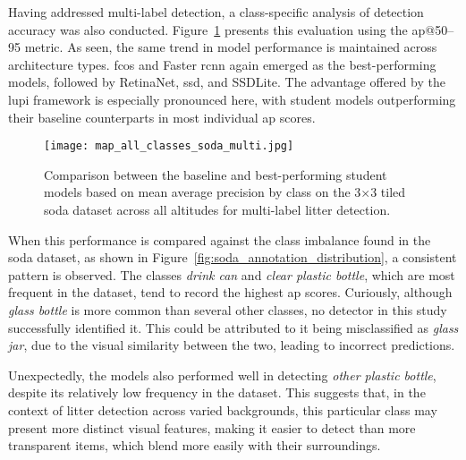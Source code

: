 Having addressed multi-label detection, a class-specific analysis of detection accuracy was also conducted. Figure~\ref{fig:soda_tiled_multi_per_class} presents this evaluation using the \gls{ap}@50--95 metric. As seen, the same trend in model performance is maintained across architecture types. \gls{fcos} and Faster \gls{rcnn} again emerged as the best-performing models, followed by RetinaNet, \gls{ssd}, and SSDLite. The advantage offered by the \gls{lupi} framework is especially pronounced here, with student models outperforming their baseline counterparts in most individual \gls{ap} scores.

\begin{figure}[!ht]
    \centering
    \texttt{[image: map\_all\_classes\_soda\_multi.jpg]}
    \caption{Comparison between the baseline and best-performing student models based on mean average precision by class on the 3$\times$3 tiled \gls{soda} dataset across all altitudes for multi-label litter detection.}
    \label{fig:soda_tiled_multi_per_class}
\end{figure}

When this performance is compared against the class imbalance found in the \gls{soda} dataset, as shown in Figure~\ref{fig:soda_annotation_distribution}, a consistent pattern is observed. The classes \textit{drink can} and \textit{clear plastic bottle}, which are most frequent in the dataset, tend to record the highest \gls{ap} scores. Curiously, although \textit{glass bottle} is more common than several other classes, no detector in this study successfully identified it. This could be attributed to it being misclassified as \textit{glass jar}, due to the visual similarity between the two, leading to incorrect predictions.

Unexpectedly, the models also performed well in detecting \textit{other plastic bottle}, despite its relatively low frequency in the dataset. This suggests that, in the context of litter detection across varied backgrounds, this particular class may present more distinct visual features, making it easier to detect than more transparent items, which blend more easily with their surroundings.

